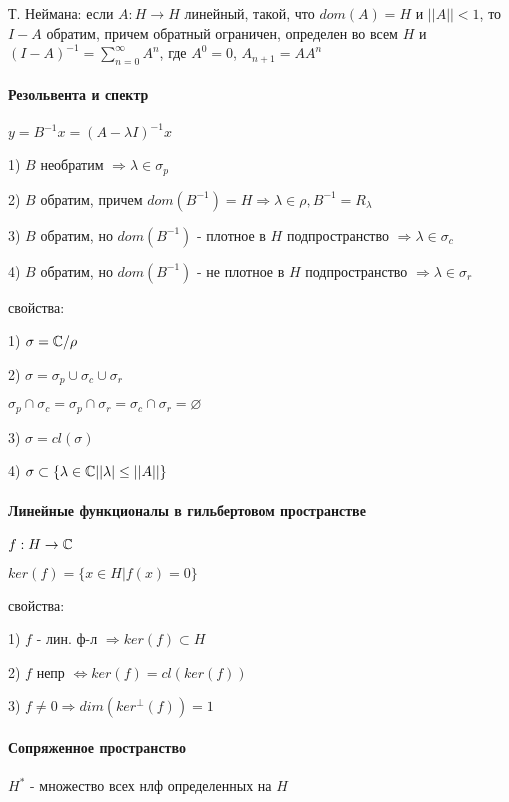 \documentclass[russian,twocolumn]{article}
\begin{document}
Т. Неймана: если $A:H\to H$ линейный, такой, что $dom(A) = H$ и $||A|| < 1$, то $I-A$ обратим, причем обратный ограничен, определен во всем $H$ и $(I-A)^{-1}=\sum_{n=0}^\infty A^n$, где $A^0 = 0$, $A_{n+1} = AA^n$

\paragraph{Резольвента и спектр}

$y = B^{-1} x = (A-\lambda I) ^ {-1} x$

1) $B$ необратим $\Rightarrow \lambda \in \sigma_p$

2) $B$ обратим, причем $dom(B^{-1}) = H \Rightarrow \lambda \in \rho,B^{-1} = R_\lambda$ 

3) $B$ обратим, но $dom(B^{-1})$ - плотное в $H$ подпространство $\Rightarrow \lambda \in \sigma_c$

4) $B$ обратим, но $dom(B^{-1})$ - не плотное в $H$ подпространство $\Rightarrow \lambda \in \sigma_r$

свойства: 

1) $\sigma = \Bbb C / \rho$

2) $\sigma = \sigma_p \cup \sigma_c \cup \sigma_r$

$\sigma_p \cap \sigma_c = \sigma_p \cap \sigma_r = \sigma_c \cap \sigma_r = \varnothing$

3) $\sigma = cl(\sigma)$

4) $\sigma \subset \{\lambda \in \Bbb C | |\lambda| \le ||A||\}$

\paragraph{Линейные функционалы в гильбертовом пространстве}

$f:H \to \Bbb C$

$ker(f)=\{x\in H | f(x) = 0\}$

свойства:

1) $f$ - лин. ф-л $\Rightarrow ker(f) \subset H$ 

2) $f$ непр $\iff ker(f) = cl(ker(f))$

3) $f \ne 0 \Rightarrow dim(ker^\perp (f)) = 1$

\paragraph{Сопряженное пространство}

$H^*$ - множество всех нлф определенных на $H$
\end{document}
